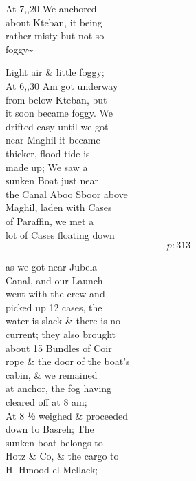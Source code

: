 \documentclass{report}
\begin{document}
	\par{
 	At 7,,20 We anchored\ \\about Kteban, it being\ \\rather misty but not so\ \\foggy\~{}\ \\
	}

	\par{
 	Light air \& little foggy;\ \\At 6,,30 Am got underway\ \\from below Kteban, but\ \\it soon became foggy. We\ \\drifted easy until we got\ \\near Maghil it became\ \\thicker, flood tide is\ \\made up; We saw a\ \\sunken Boat just near\ \\the Canal Aboo Sboor above\ \\Maghil, laden with Cases\ \\of Paraffin, we met a\ \\lot of Cases floating down\ \\
  \[p: 313 \]

	}


	\par{
 	as we got near Jubela\ \\Canal, and our Launch\ \\went with the crew and\ \\picked up 12 cases, the\ \\water is slack \& there is no\ \\current; they also brought\ \\about 15 Bundles of Coir\ \\rope \& the door of the boat’s\ \\cabin, \& we remained\ \\at anchor, the fog having\ \\cleared off at 8 am;\ \\At 8 ½ weighed \& proceeded\ \\down to Basreh; The\ \\sunken boat belongs to\ \\Hotz \& Co, \& the cargo to\ \\H. Hmood el Mellack;\ \\
	}
\end{document}
